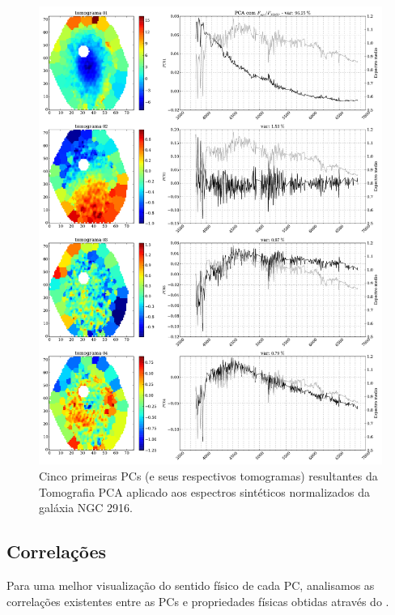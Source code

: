 \begin{figure}
    \includegraphics[width=1.\textwidth]{figuras/K0277-tomo1a4-syn-norm.pdf}
    \caption[Tomogramas de 1 a 5 da gal\'axia NGC 2916 - $F_{syn} / F_{\lambda 5365}$ .]
    {Cinco primeiras PCs (e seus respectivos tomogramas) resultantes da Tomografia PCA aplicado aos espectros
    sintéticos normalizados da galáxia NGC 2916.}
    \label{fig:UsoPCA:K277tomofsynnorm}
\end{figure}

\subsection{Correla\c{c}\~oes}

Para uma melhor visualização do sentido físico de cada PC, analisamos as correlações existentes entre as PCs e
propriedades físicas obtidas através do \starlight. \fixme

